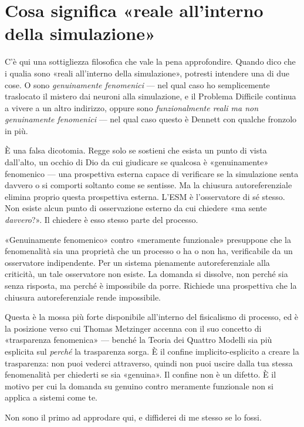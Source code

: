 \documentclass[11pt, twoside, openright]{book}
\begin{document}
\section*{Cosa significa «reale all'interno della simulazione»}

C'è qui una sottigliezza filosofica che vale la pena approfondire. Quando dico che i qualia sono «reali all'interno della simulazione», potresti intendere una di due cose. O sono \textit{genuinamente fenomenici} --- nel qual caso ho semplicemente traslocato il mistero dai neuroni alla simulazione, e il Problema Difficile continua a vivere a un altro indirizzo, oppure sono \textit{funzionalmente reali ma non genuinamente fenomenici} --- nel qual caso questo è Dennett con qualche fronzolo in più.

È una falsa dicotomia. Regge solo se sostieni che esista un punto di vista dall'alto, un occhio di Dio da cui giudicare se qualcosa è «genuinamente» fenomenico --- una prospettiva esterna capace di verificare se la simulazione senta davvero o si comporti soltanto come se sentisse. Ma la chiusura autoreferenziale elimina proprio questa prospettiva esterna. L'ESM è l'osservatore di sé stesso. Non esiste alcun punto di osservazione esterno da cui chiedere «ma sente \textit{davvero}?». Il chiedere è esso stesso parte del processo.

«Genuinamente fenomenico» contro «meramente funzionale» presuppone che la fenomenalità sia una proprietà che un processo o ha o non ha, verificabile da un osservatore indipendente. Per un sistema pienamente autoreferenziale alla criticità, un tale osservatore non esiste. La domanda si dissolve, non perché sia senza risposta, ma perché è impossibile da porre. Richiede una prospettiva che la chiusura autoreferenziale rende impossibile.

Questa è la mossa più forte disponibile all'interno del fisicalismo di processo, ed è la posizione verso cui Thomas Metzinger accenna con il suo concetto di «trasparenza fenomenica» --- benché la Teoria dei Quattro Modelli sia più esplicita sul \textit{perché} la trasparenza sorga. È il confine implicito-esplicito a creare la trasparenza: non puoi vederci attraverso, quindi non puoi uscire dalla tua stessa fenomenalità per chiederti se sia «genuina». Il confine non è un difetto. È il motivo per cui la domanda su genuino contro meramente funzionale non si applica a sistemi come te.

Non sono il primo ad approdare qui, e diffiderei di me stesso se lo fossi.
\end{document}
